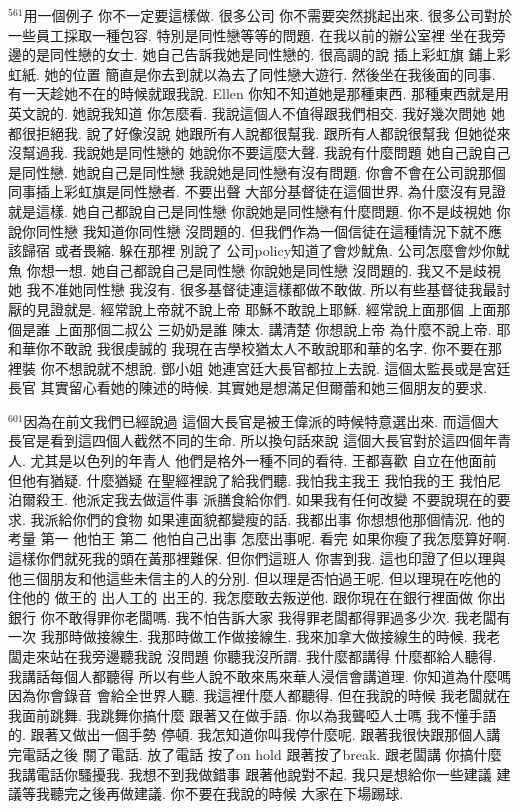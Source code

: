 \documentclass{book}
\begin{document}
$^{561}$用一個例子 你不一定要這樣做.
很多公司 你不需要突然挑起出來.
很多公司對於一些員工採取一種包容.
特別是同性戀等等的問題.
在我以前的辦公室裡 坐在我旁邊的是同性戀的女士.
她自己告訴我她是同性戀的.
很高調的說 插上彩虹旗 鋪上彩虹紙.
她的位置 簡直是你去到就以為去了同性戀大遊行.
然後坐在我後面的同事.
有一天趁她不在的時候就跟我說.
Ellen 你知不知道她是那種東西.
那種東西就是用英文說的.
她說我知道 你怎麼看.
我說這個人不值得跟我們相交.
我好幾次問她 她都很拒絕我.
說了好像沒說 她跟所有人說都很幫我.
跟所有人都說很幫我 但她從來沒幫過我.
我說她是同性戀的 她說你不要這麼大聲.
我說有什麼問題 她自己說自己是同性戀.
她說自己是同性戀 我說她是同性戀有沒有問題.
你會不會在公司說那個同事插上彩虹旗是同性戀者.
不要出聲 大部分基督徒在這個世界.
為什麼沒有見證就是這樣.
她自己都說自己是同性戀 你說她是同性戀有什麼問題.
你不是歧視她 你說你同性戀 我知道你同性戀 沒問題的.
但我們作為一個信徒在這種情況下就不應該歸宿 或者畏縮.
躲在那裡 別說了 公司policy知道了會炒魷魚.
公司怎麼會炒你魷魚 你想一想.
她自己都說自己是同性戀 你說她是同性戀 沒問題的.
我又不是歧視她 我不准她同性戀 我沒有.
很多基督徒連這樣都做不敢做.
所以有些基督徒我最討厭的見證就是.
經常說上帝就不說上帝 耶穌不敢說上耶穌.
經常說上面那個 上面那個是誰 上面那個二叔公 三奶奶是誰 陳太.
講清楚 你想說上帝 為什麼不說上帝.
耶和華你不敢說 我很虔誠的 我現在吉學校猶太人不敢說耶和華的名字.
你不要在那裡裝 你不想說就不想說.
鄧小姐 她連宮廷大長官都拉上去說.
這個太監長或是宮廷長官 其實留心看她的陳述的時候.
其實她是想滿足但爾蕾和她三個朋友的要求.

$^{601}$因為在前文我們已經說過 這個大長官是被王偉派的時候特意選出來.
而這個大長官是看到這四個人截然不同的生命.
所以換句話來說 這個大長官對於這四個年青人.
尤其是以色列的年青人 他們是格外一種不同的看待.
王都喜歡 自立在他面前 但他有猶疑.
什麼猶疑 在聖經裡說了給我們聽.
我怕我主我王 我怕我的王 我怕尼泊爾殺王.
他派定我去做這件事 派膳食給你們.
如果我有任何改變 不要說現在的要求.
我派給你們的食物 如果連面貌都變瘦的話.
我都出事 你想想他那個情況.
他的考量 第一 他怕王 第二 他怕自己出事 怎麼出事呢.
看完 如果你瘦了我怎麼算好啊.
這樣你們就死我的頭在黃那裡難保.
但你們這班人 你害到我.
這也印證了但以理與他三個朋友和他這些未信主的人的分別.
但以理是否怕過王呢.
但以理現在吃他的 住他的 做王的 出人工的 出王的.
我怎麼敢去叛逆他.
跟你現在在銀行裡面做 你出銀行 你不敢得罪你老闆嗎.
我不怕告訴大家 我得罪老闆都得罪過多少次.
我老闆有一次 我那時做接線生.
我那時做工作做接線生.
我來加拿大做接線生的時候.
我老闆走來站在我旁邊聽我說 沒問題 你聽我沒所謂.
我什麼都講得 什麼都給人聽得.
我講話每個人都聽得 所以有些人說不敢來馬來華人浸信會講道理.
你知道為什麼嗎 因為你會錄音 會給全世界人聽.
我這裡什麼人都聽得.
但在我說的時候 我老闆就在我面前跳舞.
我跳舞你搞什麼 跟著又在做手語.
你以為我聾啞人士嗎 我不懂手語的.
跟著又做出一個手勢 停頓.
我怎知道你叫我停什麼呢.
跟著我很快跟那個人講完電話之後 關了電話.
放了電話 按了on hold 跟著按了break.
跟老闆講 你搞什麼 我講電話你騷擾我.
我想不到我做錯事 跟著他說對不起.
我只是想給你一些建議 建議等我聽完之後再做建議.
你不要在我說的時候 大家在下場踢球.
\end{document}

